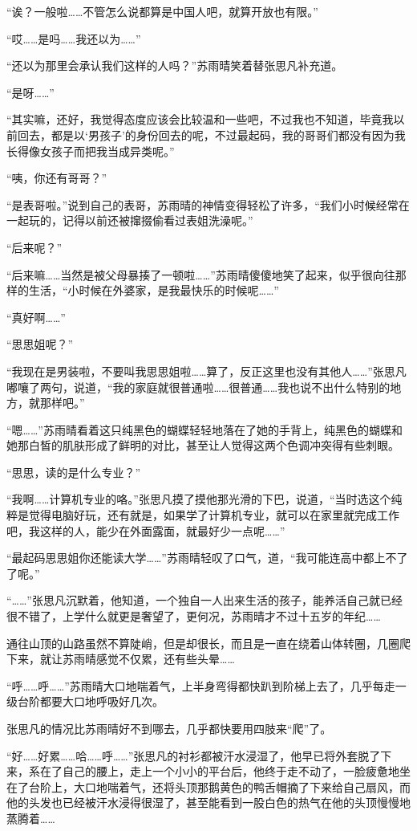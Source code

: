“诶？一般啦……不管怎么说都算是中国人吧，就算开放也有限。”

“哎……是吗……我还以为……”

“还以为那里会承认我们这样的人吗？”苏雨晴笑着替张思凡补充道。

“是呀……”

“其实嘛，还好，我觉得态度应该会比较温和一些吧，不过我也不知道，毕竟我以前回去，都是以‘男孩子’的身份回去的呢，不过最起码，我的哥哥们都没有因为我长得像女孩子而把我当成异类呢。”

“咦，你还有哥哥？”

“是表哥啦。”说到自己的表哥，苏雨晴的神情变得轻松了许多，“我们小时候经常在一起玩的，记得以前还被撺掇偷看过表姐洗澡呢。”

“后来呢？”

“后来嘛……当然是被父母暴揍了一顿啦……”苏雨晴傻傻地笑了起来，似乎很向往那样的生活，“小时候在外婆家，是我最快乐的时候呢……”

“真好啊……”

“思思姐呢？”

“我现在是男装啦，不要叫我思思姐啦……算了，反正这里也没有其他人……”张思凡嘟嚷了两句，说道，“我的家庭就很普通啦……很普通……我也说不出什么特别的地方，就那样吧。”

“嗯……”苏雨晴看着这只纯黑色的蝴蝶轻轻地落在了她的手背上，纯黑色的蝴蝶和她那白皙的肌肤形成了鲜明的对比，甚至让人觉得这两个色调冲突得有些刺眼。

“思思，读的是什么专业？”

“我啊……计算机专业的咯。”张思凡摸了摸他那光滑的下巴，说道，“当时选这个纯粹是觉得电脑好玩，还有就是，如果学了计算机专业，就可以在家里就完成工作吧，我这样的人，能少在外面露面，就最好少一点呢……”

“最起码思思姐你还能读大学……”苏雨晴轻叹了口气，道，“我可能连高中都上不了了呢。”

“……”张思凡沉默着，他知道，一个独自一人出来生活的孩子，能养活自己就已经很不错了，上学什么就更是奢望了，更何况，苏雨晴才不过十五岁的年纪……

通往山顶的山路虽然不算陡峭，但是却很长，而且是一直在绕着山体转圈，几圈爬下来，就让苏雨晴感觉不仅累，还有些头晕……

“呼……呼……”苏雨晴大口地喘着气，上半身弯得都快趴到阶梯上去了，几乎每走一级台阶都要大口地呼吸好几次。

张思凡的情况比苏雨晴好不到哪去，几乎都快要用四肢来“爬”了。

“好……好累……哈……呼……”张思凡的衬衫都被汗水浸湿了，他早已将外套脱了下来，系在了自己的腰上，走上一个小小的平台后，他终于走不动了，一脸疲惫地坐在了台阶上，大口地喘着气，还将头顶那鹅黄色的鸭舌帽摘了下来给自己扇风，而他的头发也已经被汗水浸得很湿了，甚至能看到一股白色的热气在他的头顶慢慢地蒸腾着……

